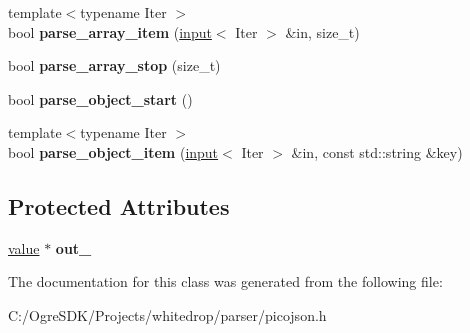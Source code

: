 \begin{DoxyCompactItemize}
\item 
\hypertarget{classpicojson_1_1default__parse__context_a5f65224e655633b20c1f8c5967c153bb}{{\footnotesize template$<$typename Iter $>$ }\\bool {\bfseries parse\+\_\+array\+\_\+item} (\hyperlink{classpicojson_1_1input}{input}$<$ Iter $>$ \&in, size\+\_\+t)}\label{classpicojson_1_1default__parse__context_a5f65224e655633b20c1f8c5967c153bb}

\item 
\hypertarget{classpicojson_1_1default__parse__context_aa6ac46d87d620377429438675ba9fab2}{bool {\bfseries parse\+\_\+array\+\_\+stop} (size\+\_\+t)}\label{classpicojson_1_1default__parse__context_aa6ac46d87d620377429438675ba9fab2}

\item 
\hypertarget{classpicojson_1_1default__parse__context_a54eba00b93ce4cdaf8b2acac4ef3e046}{bool {\bfseries parse\+\_\+object\+\_\+start} ()}\label{classpicojson_1_1default__parse__context_a54eba00b93ce4cdaf8b2acac4ef3e046}

\item 
\hypertarget{classpicojson_1_1default__parse__context_adf71929b098e4f4b5c32222af149655a}{{\footnotesize template$<$typename Iter $>$ }\\bool {\bfseries parse\+\_\+object\+\_\+item} (\hyperlink{classpicojson_1_1input}{input}$<$ Iter $>$ \&in, const std\+::string \&key)}\label{classpicojson_1_1default__parse__context_adf71929b098e4f4b5c32222af149655a}

\end{DoxyCompactItemize}
\subsection*{Protected Attributes}
\begin{DoxyCompactItemize}
\item 
\hypertarget{classpicojson_1_1default__parse__context_a89547d73da32e470068649e54646ff19}{\hyperlink{classpicojson_1_1value}{value} $\ast$ {\bfseries out\+\_\+}}\label{classpicojson_1_1default__parse__context_a89547d73da32e470068649e54646ff19}

\end{DoxyCompactItemize}


The documentation for this class was generated from the following file\+:\begin{DoxyCompactItemize}
\item 
C\+:/\+Ogre\+S\+D\+K/\+Projects/whitedrop/parser/picojson.\+h\end{DoxyCompactItemize}
